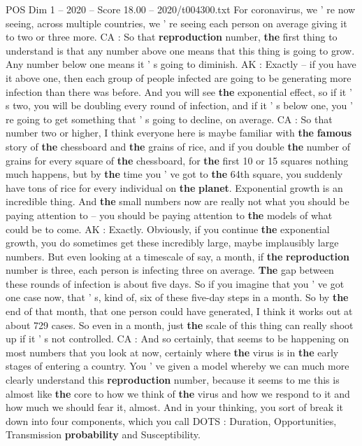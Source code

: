 \begin{textsample}{POS Dim 1 – 2020 – Score 18.00 – 2020/t004300.txt}
For coronavirus, we ' re now seeing, across multiple countries, we ' re seeing each person on average giving it to two or three more.
CA : So that \textbf{reproduction} number, \textbf{the} first thing to understand is that any number above one means that this thing is going to grow.
Any number below one means it ' s going to diminish.
AK : Exactly -- if you have it above one, then each group of people infected are going to be generating more infection than there was before.
And you will see \textbf{the} exponential effect, so if it ' s two, you will be doubling every round of infection, and if it ' s below one, you ' re going to get something that ' s going to decline, on average.
CA : So that number two or higher, I think everyone here is maybe familiar with \textbf{the} \textbf{famous} story of \textbf{the} chessboard and \textbf{the} grains of rice, and if you double \textbf{the} number of grains for every square of \textbf{the} chessboard, for \textbf{the} first 10 or 15 squares nothing much happens, but by \textbf{the} time you ' ve got to \textbf{the} 64th square, you suddenly have tons of rice for every individual on \textbf{the} \textbf{planet}.
Exponential growth is an incredible thing.
And \textbf{the} small numbers now are really not what you should be paying attention to -- you should be paying attention to \textbf{the} models of what could be to come.
AK : Exactly.
Obviously, if you continue \textbf{the} exponential growth, you do sometimes get these incredibly large, maybe implausibly large numbers.
But even looking at a timescale of say, a month, if \textbf{the} \textbf{reproduction} number is three, each person is infecting three on average. \textbf{The} gap between these rounds of infection is about five days.
So if you imagine that you ' ve got one case now, that ' s, kind of, six of these five-day steps in a month.
So by \textbf{the} end of that month, that one person could have generated, I think it works out at about 729 cases.
So even in a month, just \textbf{the} scale of this thing can really shoot up if it ' s not controlled.
CA : And so certainly, that seems to be happening on most numbers that you look at now, certainly where \textbf{the} virus is in \textbf{the} early stages of entering a country.
You ' ve given a model whereby we can much more clearly understand this \textbf{reproduction} number, because it seems to me this is almost like \textbf{the} core to how we think of \textbf{the} virus and how we respond to it and how much we should fear it, almost.
And in your thinking, you sort of break it down into four components, which you call DOTS : Duration, Opportunities, Transmission \textbf{probability} and Susceptibility.

\end{textsample}
